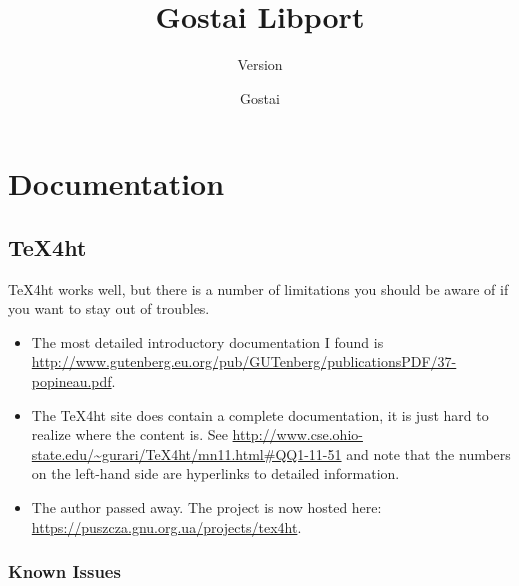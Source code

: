 \documentclass[openright,twoside,11pt]{book}
\title{Gostai Libport}
\subtitle{Version \VcsDescription}
\author{Gostai}
\begin{document}
\maketitle

\chapter{Documentation}

\section{TeX4ht}

TeX4ht works well, but there is a number of limitations you should be
aware of if you want to stay out of troubles.
\begin{itemize}
\item The most detailed introductory documentation I found is
  \url{http://www.gutenberg.eu.org/pub/GUTenberg/publicationsPDF/37-popineau.pdf}.
\item The TeX4ht site does contain a complete documentation, it is
  just hard to realize where the content is.  See
  \url{http://www.cse.ohio-state.edu/~gurari/TeX4ht/mn11.html#QQ1-11-51}
  and note that the numbers on the left-hand side are hyperlinks to
  detailed information.
\item The author passed away.  The project is now hosted here:
  \url{https://puszcza.gnu.org.ua/projects/tex4ht}.
\end{itemize}

\subsection{Known Issues}
\end{document}
